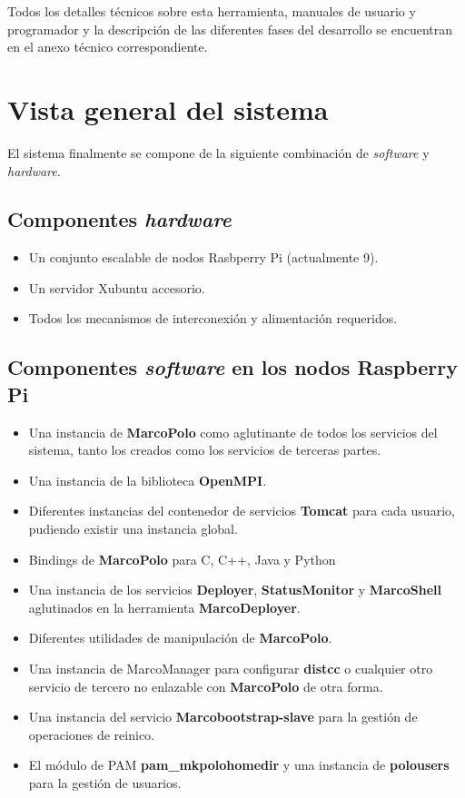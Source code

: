 Todos los detalles técnicos sobre esta herramienta, manuales de usuario y programador y la descripción de las diferentes fases del desarrollo se encuentran en el anexo técnico correspondiente.
\section{Vista general del sistema}

El sistema finalmente se compone de la siguiente combinación de \textit{software} y \textit{hardware}.

\subsection{Componentes \textit{hardware}}

\begin{itemize}
\item Un conjunto escalable de nodos Rasbperry Pi (actualmente 9).
\item Un servidor Xubuntu accesorio.
\item Todos los mecanismos de interconexión y alimentación requeridos.
\end{itemize}

\subsection{Componentes \textit{software} en los nodos Raspberry Pi}

\begin{itemize}
	\item Una instancia de \textbf{MarcoPolo} como aglutinante de todos los servicios del sistema, tanto los creados como los servicios de terceras partes.
	\item Una instancia de la biblioteca \textbf{OpenMPI}.
	\item Diferentes instancias del contenedor de servicios \textbf{Tomcat} para cada usuario, pudiendo existir una instancia global.
	\item Bindings de \textbf{MarcoPolo} para C, C++, Java y Python
	\item Una instancia de los servicios \textbf{Deployer}, \textbf{StatusMonitor} y \textbf{MarcoShell} aglutinados en la herramienta \textbf{MarcoDeployer}.
	\item Diferentes utilidades de manipulación de \textbf{MarcoPolo}.
	\item Una instancia de MarcoManager para configurar \textbf{distcc} o cualquier otro servicio de tercero no enlazable con \textbf{MarcoPolo} de otra forma.
	\item Una instancia del servicio \textbf{Marcobootstrap-slave} para la gestión de operaciones de reinico.
	\item El módulo de PAM \textbf{pam\_mkpolohomedir} y una instancia de \textbf{polousers} para la gestión de usuarios.
\end{itemize}

